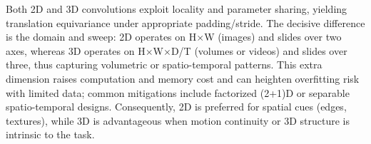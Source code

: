 Both 2D and 3D convolutions exploit locality and parameter sharing, yielding translation equivariance under appropriate padding/stride. The decisive difference is the domain and sweep: 2D operates on H$\times$W (images) and slides over two axes, whereas 3D operates on H$\times$W$\times$D/T (volumes or videos) and slides over three, thus capturing volumetric or spatio-temporal patterns. This extra dimension raises computation and memory cost and can heighten overfitting risk with limited data; common mitigations include factorized (2+1)D or separable spatio-temporal designs. Consequently, 2D is preferred for spatial cues (edges, textures), while 3D is advantageous when motion continuity or 3D structure is intrinsic to the task.

